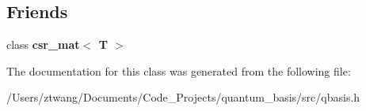 \subsection*{Friends}
\begin{DoxyCompactItemize}
\item 
\mbox{\label{classqbasis_1_1lil__mat_a49045f9373d901d71be24c338544a88a}} 
class {\bfseries csr\+\_\+mat$<$ T $>$}
\end{DoxyCompactItemize}


The documentation for this class was generated from the following file\+:\begin{DoxyCompactItemize}
\item 
/\+Users/ztwang/\+Documents/\+Code\+\_\+\+Projects/quantum\+\_\+basis/src/qbasis.\+h\end{DoxyCompactItemize}
